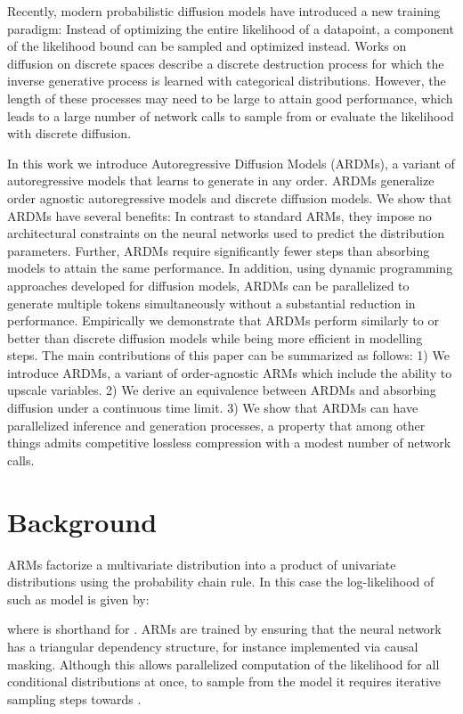 \documentclass{article} \usepackage{iclr2022_conference,times}
\begin{document}
Recently, modern probabilistic diffusion models have introduced a new training paradigm: Instead of optimizing the entire likelihood of a datapoint, a component of the likelihood bound can be sampled and optimized instead. Works on diffusion on discrete spaces \citep{sohldickstein2015diffusion,hoogeboom2021argmaxflows,austin2021structured} describe a discrete destruction process for which the inverse generative process is learned with categorical distributions. However, the length of these processes may need to be large to attain good performance, which leads to a large number of network calls to sample from or evaluate the likelihood with discrete diffusion.

In this work we introduce Autoregressive Diffusion Models (ARDMs), a variant of autoregressive models that learns to generate in any order. ARDMs generalize order agnostic autoregressive models and discrete diffusion models.  We show that ARDMs have several benefits: In contrast to standard ARMs, they impose no architectural constraints on the neural networks used to predict the distribution parameters. Further, ARDMs require significantly fewer steps than absorbing models to attain the same performance. In addition, using dynamic programming approaches developed for diffusion models, ARDMs can be parallelized to generate multiple tokens simultaneously without a substantial reduction in performance. Empirically we demonstrate that ARDMs perform similarly to or better than discrete diffusion models while being more efficient in modelling steps. The main contributions of this paper can be summarized as follows: 1) We introduce ARDMs, a variant of order-agnostic ARMs which include the ability to upscale variables. 2) We derive an equivalence between ARDMs and absorbing diffusion under a continuous time limit. 3) We show that ARDMs can have parallelized inference and generation processes, a property that among other things admits competitive lossless compression with a modest number of network calls.

 
\section{Background}
ARMs factorize a multivariate distribution into a product of  univariate distributions using the probability chain rule. In this case the log-likelihood of such as model is given by:

where  is shorthand for . ARMs are trained by ensuring that the neural network has a triangular dependency structure, for instance implemented via causal masking. Although this allows parallelized computation of the likelihood for all conditional distributions at once, to sample from the model it requires  iterative sampling steps  towards . 
\end{document}

